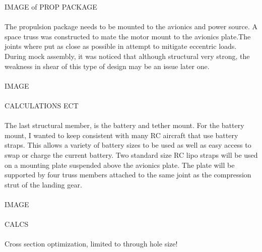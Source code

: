 \documentclass[12pt,letterpaper]{article}
\begin{document}
IMAGE of PROP PACKAGE\\\\


The propulsion package needs to be mounted to the avionics and power source. A space truss was constructed to mate the motor mount to the avionics plate.The joints where put as close as possible in attempt to mitigate eccentric loads. During mock assembly, it was noticed that although structural very strong, the weakness in shear of this type of design may be an issue later one.\\\\

IMAGE\\\\

CALCULATIONS ECT\\\\

The last structural member, is the battery and tether mount. For the battery mount, I wanted to keep consistent with many RC aircraft that use battery straps. This allows a variety of battery sizes to be used as well as easy access to swap or charge the current battery. Two standard size RC lipo straps will be used on a mounting plate suspended above the avionics plate. The plate will be supported by four truss members attached to the same joint as the compression strut of the landing gear. \\\\

IMAGE\\\\

CALCS\\\\

Cross section optimization, limited to through hole size!
\end{document}
